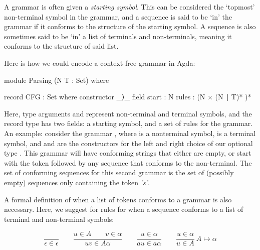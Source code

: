 	A grammar is often given a \emph{starting symbol}. This can be considered
	the `topmost' non-terminal symbol in the grammar, and a sequence is said to
	be `in' the grammar if it conforms to the structure of the starting symbol.
	A sequence is also sometimes said to be `in' a list of terminals and 
	non-terminals, meaning it conforms to the structure of said list.

	Here is how we could encode a context-free grammar in Agda:

	\begin{code}
		module Parsing (N T : Set) where

		record CFG : Set where
		  constructor _⟩_
		  field
		    start : N
		    rules : (N × (N ∣ T)* )*
	\end{code}

	Here, type arguments  and  represent non-terminal and
	terminal symbols, and the record type has two fields: a starting symbol,
	and a set of rules for the grammar.  An example: consider the grammar
	, where  is
	a nonterminal symbol,  is a terminal symbol, and  and
	 are the constructors for the left and right choice of our
	optional type . This grammar will have conforming strings that
	either are empty, or start with the token  followed by any
	sequence that conforms to the  non-terminal. The set of
	conforming sequences for this second grammar is the set of (possibly empty)
	sequences only containing the token \emph{'s'}.


	A formal definition of when a list of tokens conforms to a grammar is also
	necessary. Here, we suggest for rules for when a sequence conforms to a
	list of terminal and non-terminal symbols: 

	\[
	\frac{\ }{\epsilon\in\epsilon} \qquad
	\frac{u\in A \qquad v\in\alpha}{uv\in A\alpha} \qquad
	\frac{u\in\alpha}{au\in a\alpha} \qquad
	\frac{u\in\alpha}{u\in A}\ A \mapsto \alpha
	\]


